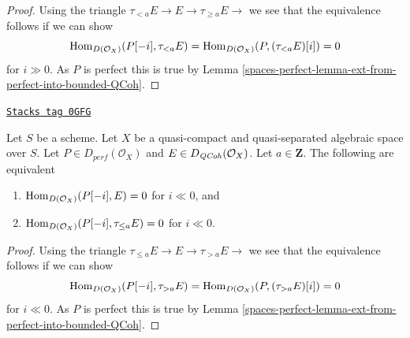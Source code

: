 \begin{proof}
Using the triangle $ \tau_{< a} E \to E \to \tau_{\geq a} E \to$
we see that the equivalence follows if we can show
$$
\operatorname{Hom}_{D(\mathcal{O}_X)}(P[-i], \tau_{< a} E) =
\operatorname{Hom}_{D(\mathcal{O}_X)}(P, (\tau_{< a} E)[i]) = 0
$$
for $i \gg 0$. As $P$ is perfect this is true by
Lemma \ref{spaces-perfect-lemma-ext-from-perfect-into-bounded-QCoh}.
\end{proof}

\begin{lemma}
\label{spaces-perfect-lemma-bounded-below-truncation}
\href{https://stacks.math.columbia.edu/tag/0GFG}{\texttt{Stacks tag 0GFG}}

Let $S$ be a scheme.
Let $X$ be a quasi-compact and quasi-separated algebraic space over $S$. Let
$P \in D_{perf}(\mathcal{O}_X)$ and $E \in D_{\mathit{QCoh}}(\mathcal{O}_X)$.
Let $a \in \mathbf{Z}$. The following are equivalent
\begin{enumerate}
\item $\operatorname{Hom}_{D(\mathcal{O}_X)}(P[-i], E) = 0$ for $i \ll 0$, and
\item $\operatorname{Hom}_{D(\mathcal{O}_X)}(P[-i], \tau_{\leq a} E) = 0$ for $i \ll 0$.
\end{enumerate}
\end{lemma}

\begin{proof}
Using the triangle $ \tau_{\leq a} E \to E \to \tau_{> a} E \to$
we see that the equivalence follows if we can show
$$
\operatorname{Hom}_{D(\mathcal{O}_X)}(P[-i], \tau_{> a} E) =
\operatorname{Hom}_{D(\mathcal{O}_X)}(P, (\tau_{> a} E)[i]) = 0
$$
for $i \ll 0$. As $P$ is perfect this is true by
Lemma \ref{spaces-perfect-lemma-ext-from-perfect-into-bounded-QCoh}.
\end{proof}

